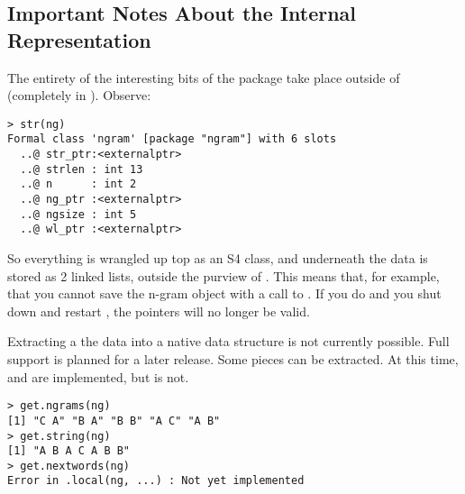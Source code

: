 \subsection{Important Notes About the Internal Representation}

The entirety of the interesting bits of the \thispackage package take place 
outside of \R (completely in \C).  Observe:
\begin{lstlisting}[language=inteRactive]
> str(ng)
Formal class 'ngram' [package "ngram"] with 6 slots
  ..@ str_ptr:<externalptr> 
  ..@ strlen : int 13
  ..@ n      : int 2
  ..@ ng_ptr :<externalptr> 
  ..@ ngsize : int 5
  ..@ wl_ptr :<externalptr> 
\end{lstlisting}

So everything is wrangled up top as an S4 class, and underneath the data is 
stored as 2 linked lists, outside the purview of \R.  This means that, for 
example, that you cannot save the n-gram object with a call to .  
If you do and you shut down and restart \R, the pointers will no longer be 
valid.

Extracting a the data into a native \R data structure is not currently 
possible.  Full support is planned for a later release.  Some pieces can be 
extracted.  At this time,  and  are 
implemented, but  is not.

\begin{lstlisting}[language=inteRactive]
> get.ngrams(ng)
[1] "C A" "B A" "B B" "A C" "A B"
> get.string(ng)
[1] "A B A C A B B"
> get.nextwords(ng)
Error in .local(ng, ...) : Not yet implemented
\end{lstlisting}